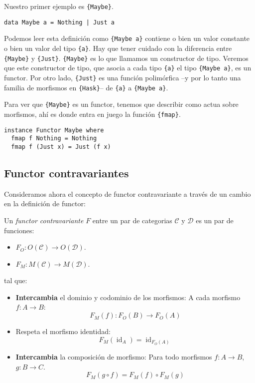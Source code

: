 \documentclass[12pt, twoside]{book}
\newcommand{\code}[1]{\Verb+{#1}+}
\newcommand{\cat}{{\mathcal{C}}}
\DeclareMathOperator{\id}{id}
\begin{document}
\begin{example}
Nuestro primer ejemplo es \code{Maybe}.
\begin{verbatim}
data Maybe a = Nothing | Just a 
\end{verbatim}

Podemos leer esta definición como \code{Maybe a} contiene o bien un valor constante o bien un valor del tipo \code{a}.
Hay que tener cuidado con la diferencia entre \code{Maybe} y \code{Just}.
\code{Maybe} es lo que llamamos un constructor de tipo.
Veremos que este constructor de tipo, que asocia a cada tipo \code{a} el tipo \code{Maybe a}, es un functor.
Por otro lado, \code{Just} es una función polimórfica --y por lo tanto una familia de morfismos en \code{Hask}-- de \code{a} a \code{Maybe a}.

Para ver que \code{Maybe} es un functor, tenemos que describir como actua sobre morfismos, ahí es donde entra en juego la función \code{fmap}.

\begin{verbatim}
instance Functor Maybe where
  fmap f Nothing = Nothing
  fmap f (Just x) = Just (f x) 
\end{verbatim}
\end{example}

\subsection{Functor contravariantes}
Consideramos ahora el concepto de functor contravariante a través de un cambio en la definición de functor:
\begin{definition}\label{def:cofunctor}
Un \emph{functor contravariante} $F$ entre un par de categorias $\cat$ y $\mathcal{D}$ es un par de funciones:
\begin{itemize}
\item $F_O : O(\cat) \to O(\mathcal{D})$.
\item $F_M : M(\cat) \to M(\mathcal{D})$.
\end{itemize}
tal que:
\begin{itemize}
\item \textbf{Intercambia} el dominio y codominio de los morfismos: A cada morfismo $f : A \to B$:
\[ F_M(f) : F_O(B) \to F_O(A) \]
\item Respeta el morfismo identidad:
\[ F_M(\id_A) = \id_{F_O(A)} \]
\item \textbf{Intercambia} la composición de morfismo: Para todo morfismos $f : A \to B$, $g : B \to C$.
\[ F_M(g \circ f) = F_M(f) \circ F_M(g) \]
\end{itemize}
\end{definition}
\end{document}
